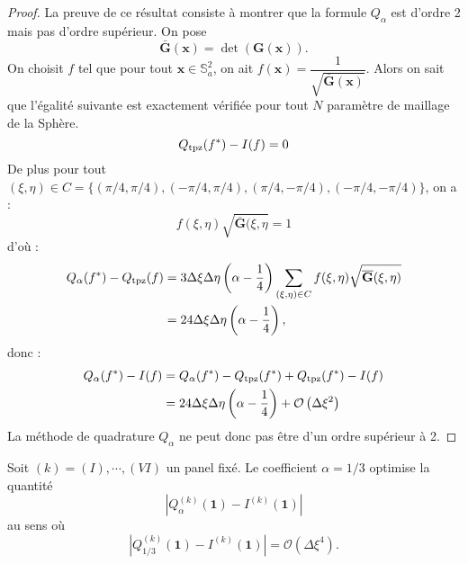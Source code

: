 \begin{proof}
La preuve de ce résultat consiste à montrer que la formule $Q_{\alpha}$ est d'ordre 2 mais pas d'ordre supérieur.
On pose
\begin{equation}
\bar{\mathbf{G}}(\mathbf{x}) = \det (\mathbf{G}(\mathbf{x})).
\end{equation}
On choisit $f$ tel que pour tout $\mathbf{x} \in \mathbb{S}_a^2$, on ait $f(\mathbf{x})=\dfrac{1}{\sqrt{\overline{\mathbf{G}}(\mathbf{x})}}$. Alors on sait que l’égalité suivante est exactement vérifiée pour tout $N$ paramètre de maillage de la Sphère.
\begin{equation}
Q_{\text{tpz}}(f^*)-I(f)=0
\end{equation}
De plus pour tout $(\xi,\eta) \in C=\{(\pi/4,\pi/4),(-\pi/4,\pi/4),(\pi/4,-\pi/4),(-\pi/4,-\pi/4) \}$, on a :
\begin{equation}
f(\xi,\eta)\sqrt{\overline{\mathbf{G}}(\xi,\eta}=1
\end{equation}
d'où :
\begin{align*}
Q_{\alpha}(f^*)-Q_{\text{tpz}}(f) & = 3 \Delta \xi \Delta \eta \left( \alpha - \dfrac{1}{4} \right)\displaystyle\sum\limits_{(\xi,\eta)\in C} f(\xi,\eta)\sqrt{\overline{\mathbf{G}}(\xi,\eta)} \\
                         & = 24 \Delta \xi \Delta \eta \left( \alpha - \dfrac{1}{4} \right),
\end{align*}
donc :
\begin{align*}
Q_{\alpha}(f^*) - I(f) & = Q_{\alpha}(f^*) - Q_{\text{tpz}}(f^*) + Q_{\text{tpz}}(f^*) - I(f) \\
                    & = 24 \Delta \xi \Delta \eta \left( \alpha - \dfrac{1}{4} \right) + \mathcal{O} \left( \Delta \xi^2 \right)
\end{align*}
La méthode de quadrature $Q_{\alpha}$ ne peut donc pas être d'un ordre supérieur à 2. 
\end{proof}



\begin{proposition}
Soit $(k) = (I), \cdots , (VI)$ un panel fixé.
Le coefficient $\alpha=1/3$ optimise la quantité
\begin{equation}
|Q_{\alpha}^{(k)}(\mathbf{1}) - I^{(k)}(\mathbf{1}) |
\end{equation}
au sens où
\begin{equation}
|Q_{1/3}^{(k)}(\mathbf{1}) - I^{(k)}(\mathbf{1}) | = \mathcal{O}\left( \Delta \xi^4 \right).
\end{equation}
\end{proposition}

